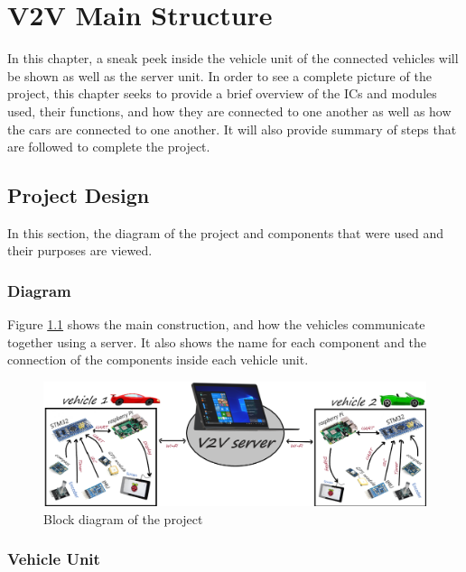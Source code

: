 \chapter{V2V Main Structure}
In this chapter, a sneak peek inside the vehicle unit of the connected vehicles will be shown as well as the server unit.\newline
In order to see a complete picture of the project, this chapter seeks to provide a brief overview of the ICs and modules used, their functions, and how they are connected to one another as well as how the cars are connected to one another. It will also provide summary of steps that are followed to complete the project.\newline

\section{Project Design}
In this section, the diagram of the project and components that were used and their purposes are viewed.

\subsection{Diagram}
Figure \ref{fig:block-diagram} shows the main construction, and how the vehicles communicate together using a server. It also shows the name for each component and the connection of the components inside each vehicle unit. 
\begin{figure}[h]
\includegraphics[width=\textwidth]{figure/2_1.png}
\caption{Block diagram of the project}
\label{fig:block-diagram}
\centering
\end{figure}

\subsection{Vehicle Unit}

